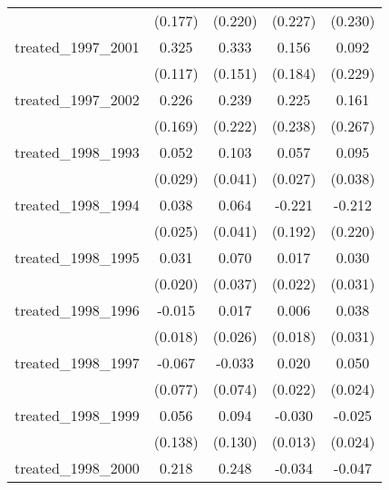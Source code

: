 {\begin{tabular}{l*{4}{c}}
            &     (0.177)         &     (0.220)         &     (0.227)         &     (0.230)         \\
[1em]
treated\_1997\_2001&       0.325\sym{**} &       0.333\sym{*}  &       0.156         &       0.092         \\
            &     (0.117)         &     (0.151)         &     (0.184)         &     (0.229)         \\
[1em]
treated\_1997\_2002&       0.226         &       0.239         &       0.225         &       0.161         \\
            &     (0.169)         &     (0.222)         &     (0.238)         &     (0.267)         \\
[1em]
treated\_1998\_1993&       0.052         &       0.103\sym{*}  &       0.057\sym{*}  &       0.095\sym{*}  \\
            &     (0.029)         &     (0.041)         &     (0.027)         &     (0.038)         \\
[1em]
treated\_1998\_1994&       0.038         &       0.064         &      -0.221         &      -0.212         \\
            &     (0.025)         &     (0.041)         &     (0.192)         &     (0.220)         \\
[1em]
treated\_1998\_1995&       0.031         &       0.070         &       0.017         &       0.030         \\
            &     (0.020)         &     (0.037)         &     (0.022)         &     (0.031)         \\
[1em]
treated\_1998\_1996&      -0.015         &       0.017         &       0.006         &       0.038         \\
            &     (0.018)         &     (0.026)         &     (0.018)         &     (0.031)         \\
[1em]
treated\_1998\_1997&      -0.067         &      -0.033         &       0.020         &       0.050\sym{*}  \\
            &     (0.077)         &     (0.074)         &     (0.022)         &     (0.024)         \\
[1em]
treated\_1998\_1999&       0.056         &       0.094         &      -0.030\sym{*}  &      -0.025         \\
            &     (0.138)         &     (0.130)         &     (0.013)         &     (0.024)         \\
[1em]
treated\_1998\_2000&       0.218         &       0.248         &      -0.034         &      -0.047         \\

\end{tabular}}
